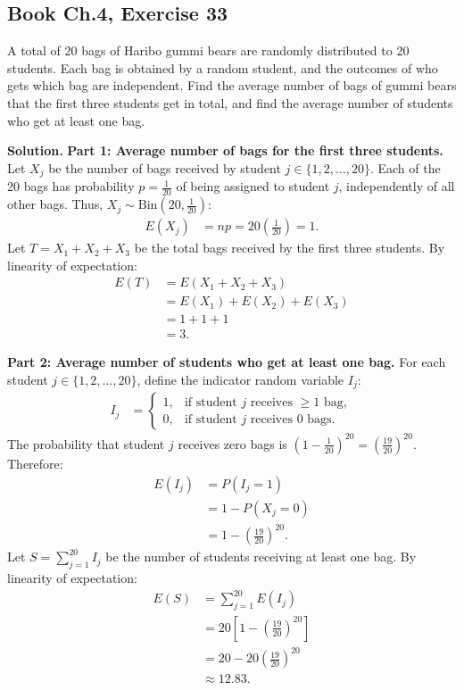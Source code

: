 \documentclass[11pt,a4paper]{article}
\begin{document}
\vspace{10pt}
\subsection{Book Ch.4, Exercise 33}
\begin{tcolorbox}[title={Book Ch.4, Exercise 33}]
A total of 20 bags of Haribo gummi bears are randomly distributed to 20 students. Each bag is obtained by a random student, and the outcomes of who gets which bag are independent. Find the average number of bags of gummi bears that the first three students get in total, and find the average number of students who get at least one bag.
\end{tcolorbox}

\noindent \textbf{Solution.} \textbf{Part 1: Average number of bags for the first three students.}
Let $X_j$ be the number of bags received by student $j \in \{1, 2, \dots, 20\}$. Each of the 20 bags has probability $p = \frac{1}{20}$ of being assigned to student $j$, independently of all other bags. Thus, $X_j \sim \text{Bin}\left(20, \frac{1}{20}\right)$:
\begin{align*}
E(X_j) &= n p = 20 \left(\frac{1}{20}\right) = 1.
\end{align*}
Let $T = X_1 + X_2 + X_3$ be the total bags received by the first three students. By linearity of expectation:
\begin{align*}
E(T) &= E(X_1 + X_2 + X_3) \\
&= E(X_1) + E(X_2) + E(X_3) \\
&= 1 + 1 + 1 \\
&= 3.
\end{align*}

\vspace{4pt}
\noindent \textbf{Part 2: Average number of students who get at least one bag.}
For each student $j \in \{1, 2, \dots, 20\}$, define the indicator random variable $I_j$:
\begin{align*}
I_j &= \begin{cases}
1, & \text{if student } j \text{ receives } \ge 1 \text{ bag}, \\
0, & \text{if student } j \text{ receives } 0 \text{ bags}.
\end{cases}
\end{align*}
The probability that student $j$ receives zero bags is $\left(1 - \frac{1}{20}\right)^{20} = \left(\frac{19}{20}\right)^{20}$. Therefore:
\begin{align*}
E(I_j) &= P(I_j = 1) \\
&= 1 - P(X_j = 0) \\
&= 1 - \left(\frac{19}{20}\right)^{20}.
\end{align*}
Let $S = \sum_{j=1}^{20} I_j$ be the number of students receiving at least one bag. By linearity of expectation:
\begin{align*}
E(S) &= \sum_{j=1}^{20} E(I_j) \\
&= 20 \left[ 1 - \left(\frac{19}{20}\right)^{20} \right] \\
&= 20 - 20\left(\frac{19}{20}\right)^{20} \\
&\approx 12.83.
\end{align*}
\end{document}
